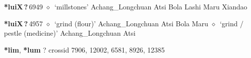   \begin{list}{}{\leftmargin=1.5em \itemindent=-1.5em}
  \item {\footnotesize \textbf{*luiX\,?\,}}{\tiny 6949}
         $\diamond$~`millstones'
         Achang\_Longchuan 
\hspace{1ex}
         Atsi 
\hspace{1ex}
         Bola 
\hspace{1ex}
         Lashi 
\hspace{1ex}
         Maru 
\hspace{1ex}
         Xiandao 
  \item {\footnotesize \textbf{*luiX\,?\,}}{\tiny 4957}
\hspace{1ex}
         $\diamond$~`grind (flour)'
         Achang\_Longchuan 
\hspace{1ex}
         Atsi 
\hspace{1ex}
         Bola 
\hspace{1ex}
         Maru 
\hspace{1ex}
         $\diamond$~`grind / pestle (medicine)'
         Achang\_Longchuan 
\hspace{1ex}
         Atsi 
  \end{list}
\item
\textbf{*lim}, \textbf{*lum}
?
  {\tiny crossid 7906, 12002, 6581, 8926, 12385}
